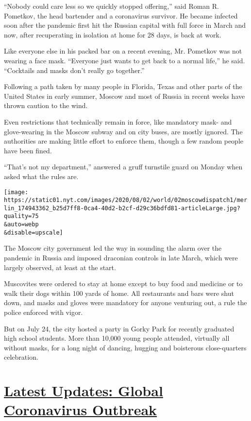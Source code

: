 ``Nobody could care less so we quickly stopped offering,'' said Roman R.
Pometkov, the head bartender and a coronavirus survivor. He became
infected soon after the pandemic first hit the Russian capital with full
force in March and now, after recuperating in isolation at home for 28
days, is back at work.

Like everyone else in his packed bar on a recent evening, Mr. Pometkov
was not wearing a face mask. ``Everyone just wants to get back to a
normal life,'' he said. ``Cocktails and masks don't really go
together.''

Following a path taken by many people in Florida, Texas and other parts
of the United States in early summer, Moscow and most of Russia in
recent weeks have thrown caution to the wind.

Even restrictions that technically remain in force, like mandatory mask-
and glove-wearing in the Moscow subway and on city buses, are mostly
ignored. The authorities are making little effort to enforce them,
though a few random people have been fined.

``That's not my department,'' answered a gruff turnstile guard on Monday
when asked what the rules are.

\texttt{[image: https://static01.nyt.com/images/2020/08/02/world/02moscowdispatch1/merlin\_174943362\_b25d7ff8-0ca4-40d2-b2cf-d29c36bdfd81-articleLarge.jpg?quality=75\\\&auto=webp\\\&disable=upscale]}

The Moscow city government led the way in sounding the alarm over the
pandemic in Russia and imposed draconian controls in late March, which
were largely observed, at least at the start.

Muscovites were ordered to stay at home except to buy food and medicine
or to walk their dogs within 100 yards of home. All restaurants and bars
were shut down, and masks and gloves were mandatory for anyone venturing
out, a rule the police enforced with vigor.

But on July 24, the city hosted a party in Gorky Park for recently
graduated high school students. More than 10,000 young people attended,
virtually all without masks, for a long night of dancing, hugging and
boisterous close-quarters celebration.

\hypertarget{latest-updates-global-coronavirus-outbreak}{%
\section{\texorpdfstring{\href{https://www.nytimes.com/2020/08/01/world/coronavirus-covid-19.html?action=click\&pgtype=Article\&state=default\&region=MAIN_CONTENT_1\&context=storylines_live_updates}{Latest
Updates: Global Coronavirus
Outbreak}}{Latest Updates: Global Coronavirus Outbreak}}\label{latest-updates-global-coronavirus-outbreak}}

